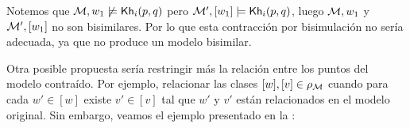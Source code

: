 
        


Notemos que $\mathcal{M}, w_1 \not\models \mathsf{Kh}_i(p,q)$ pero $\mathcal{M}', [w_1] \models \mathsf{Kh}_i(p,q)$, luego $\mathcal{M},w_1$ y 
$\mathcal{M}',[w_1]$ no son bisimilares. Por lo que esta contracción por bisimulación no sería adecuada, ya que no produce 
un modelo bisimilar.

Otra posible propuesta sería restringir más la relación entre los puntos del modelo contraído. Por ejemplo, relacionar las clases 
$[w], [v] \in \rho_{\mathcal{M}}$ cuando para cada $w' \in [w]$ existe $v' \in [v]$ tal que $w'$ y $v'$ están relacionados en el modelo 
original. Sin embargo, veamos el ejemplo presentado en la :

